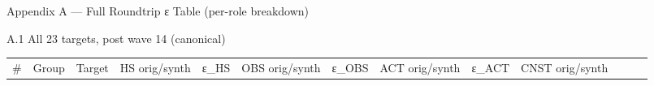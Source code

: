 \documentclass[
  ignorenonframetext,
]{beamer}
\newcounter{none} %
\begin{document}
\begin{frame}[fragile]{Appendix A --- Full Roundtrip ε Table (per-role
breakdown)}
\begin{block}{A.1 All 23 targets, post wave 14 (canonical)}
{\def\LTcaptype{none} %
\begin{longtable}[]{@{}
  >{\raggedleft\arraybackslash}p{}
  >{\raggedright\arraybackslash}p{}
  >{\raggedright\arraybackslash}p{}
  >{\centering\arraybackslash}p{}
  >{\raggedleft\arraybackslash}p{}
  >{\centering\arraybackslash}p{}
  >{\raggedleft\arraybackslash}p{}
  >{\centering\arraybackslash}p{}
  >{\raggedleft\arraybackslash}p{}
  >{\centering\arraybackslash}p{}
  >{\raggedleft\arraybackslash}p{}
  >{\raggedleft\arraybackslash}p{}
  >{\raggedright\arraybackslash}p{}@{}}
\toprule\noalign{}
\begin{minipage}[b]{\linewidth}\raggedleft
\#
\end{minipage} & \begin{minipage}[b]{\linewidth}\raggedright
Group
\end{minipage} & \begin{minipage}[b]{\linewidth}\raggedright
Target
\end{minipage} & \begin{minipage}[b]{\linewidth}\centering
HS orig/synth
\end{minipage} & \begin{minipage}[b]{\linewidth}\raggedleft
ε\_HS
\end{minipage} & \begin{minipage}[b]{\linewidth}\centering
OBS orig/synth
\end{minipage} & \begin{minipage}[b]{\linewidth}\raggedleft
ε\_OBS
\end{minipage} & \begin{minipage}[b]{\linewidth}\centering
ACT orig/synth
\end{minipage} & \begin{minipage}[b]{\linewidth}\raggedleft
ε\_ACT
\end{minipage} & \begin{minipage}[b]{\linewidth}\centering
CNST orig/synth
\end{minipage} & \begin{minipage}[b]{\linewidth}\raggedleft

\end{minipage}
\end{longtable}}
\end{block}
\end{frame}
\end{document}

